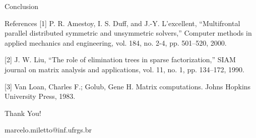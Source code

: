 \documentclass[presentation]{beamer}
\begin{document}
\begin{frame}[label={sec:org09ae9aa}]{Conclusion}
\end{frame}
\begin{frame}[label={sec:orgcc17679}]{References}
\footnotesize{[1] P. R. Amestoy, I. S. Duff, and J.-Y. L’excellent, “Multifrontal parallel
distributed symmetric and unsymmetric solvers,” Computer methods in applied mechanics and
engineering, vol. 184, no. 2-4, pp. 501–520, 2000.}

\footnotesize{[2] J. W. Liu, “The role of elimination trees in sparse factorization,”
SIAM journal on matrix analysis and applications, vol. 11, no. 1, pp. 134–172, 1990.}

\footnotesize{[3] Van Loan, Charles F.; Golub, Gene H. Matrix computations. Johns Hopkins
University Press, 1983.}
\end{frame}
\begin{frame}[label={sec:orgd50d830}]{}
\begin{center}
\Huge{Thank You!}

\newline

\Large{marcelo.miletto@inf.ufrgs.br}
\end{center}
\end{frame}
\end{document}
